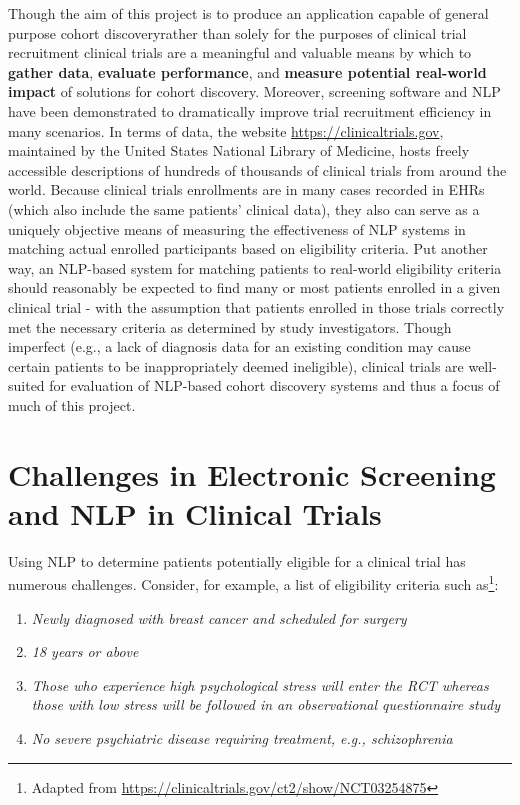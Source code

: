 \documentclass[../main.tex]{subfiles}
\begin{document}
Though the aim of this project is to produce an application capable of general purpose cohort discovery\textemdash rather than solely for the purposes of clinical trial recruitment \textemdash clinical trials are a meaningful and valuable means by which to \textbf{gather data}, \textbf{evaluate performance}, and \textbf{measure potential real-world impact} of solutions for cohort discovery. Moreover, screening software and NLP have been demonstrated to dramatically improve trial recruitment efficiency in many scenarios.
In terms of data, the website \url{https://clinicaltrials.gov}, maintained by the United States National Library of Medicine, hosts freely accessible descriptions of hundreds of thousands of clinical trials from around the world. Because clinical trials enrollments are in many cases recorded in EHRs (which also include the same patients' clinical data), they also can serve as a uniquely objective means of measuring the effectiveness of NLP systems in matching actual enrolled participants based on eligibility criteria. Put another way, an NLP-based system for matching patients to real-world eligibility criteria should reasonably be expected to find many or most patients enrolled in a given clinical trial - with the assumption that patients enrolled in those trials correctly met the necessary criteria as determined by study investigators. Though imperfect (e.g., a lack of diagnosis data for an existing condition may cause certain patients to be inappropriately deemed ineligible), clinical trials are well-suited for evaluation of NLP-based cohort discovery systems and thus a focus of much of this project.

\section{Challenges in Electronic Screening and NLP in Clinical Trials}

Using NLP to determine patients potentially eligible for a clinical trial has numerous challenges. Consider, for example, a list of eligibility criteria such as\footnote{Adapted from  \url{https://clinicaltrials.gov/ct2/show/NCT03254875}}:

\begin{enumerate}
    \itemsep0em 
    \item \textit{Newly diagnosed with breast cancer and scheduled for surgery}
    \item \textit{18 years or above}
    \item \textit{Those who experience high psychological stress will enter the RCT whereas those with low stress will be followed in an observational questionnaire study}
    \item \textit{No severe psychiatric disease requiring treatment, e.g., schizophrenia}
\end{enumerate}
\end{document}
